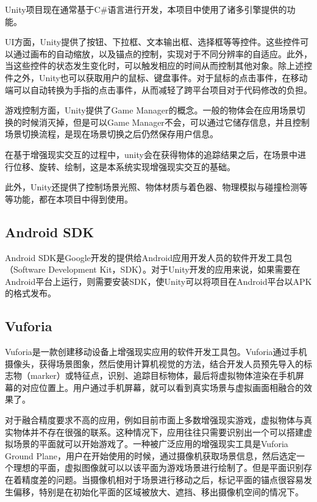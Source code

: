 Unity项目现在通常基于C\#语言进行开发，本项目中使用了诸多引擎提供的功能。
	
UI方面，Unity提供了按钮、下拉框、文本输出框、选择框等等控件。这些控件可以通过画布的自动缩放，以及锚点的控制，实现对于不同分辨率的自适应。此外，当这些控件的状态发生变化时，可以触发相应的时间从而控制其他对象。除上述控件之外，Unity也可以获取用户的鼠标、键盘事件。对于鼠标的点击事件，在移动端可以自动转换为手指的点击事件，从而减轻了跨平台项目对于代码修改的负担。

游戏控制方面，Unity提供了Game Manager的概念。一般的物体会在应用场景切换的时候消灭掉，但是可以Game Manager不会，可以通过它储存信息，并且控制场景切换流程，是现在场景切换之后仍然保存用户信息。

在基于增强现实交互的过程中，unity会在获得物体的追踪结果之后，在场景中进行位移、旋转、绘制，这是本系统实现增强现实交互的基础。

此外，Unity还提供了控制场景光照、物体材质与着色器、物理模拟与碰撞检测等等功能，都在本项目中得到使用。

\subsection{Android SDK}
Android SDK\cite{Android}是Google开发的提供给Android应用开发人员的软件开发工具包（Software Development Kit，SDK）。对于Unity开发的应用来说，如果需要在Android平台上运行，则需要安装SDK，使Unity可以将项目在Android平台以APK的格式发布。

\subsection{Vuforia}
	Vuforia\cite{Vuforia}是一款创建移动设备上增强现实应用的软件开发工具包。Vuforia通过手机摄像头，获得场景图象，然后使用计算机视觉的方法，结合开发人员预先导入的标志物（marker）或特征点，识别、追踪目标物体，最后将虚拟物体渲染在手机屏幕的对应位置上。用户通过手机屏幕，就可以看到真实场景与虚拟画面相融合的效果了。
	
对于融合精度要求不高的应用，例如目前市面上多数增强现实游戏，虚拟物体与真实物体并不存在很强的联系。这种情况下，应用往往只需要识别出一个可以搭建虚拟场景的平面就可以开始游戏了。一种被广泛应用的增强现实工具是Vuforia Ground Plane\cite{VuforiaGround}，用户在开始使用的时候，通过摄像机获取场景信息，然后选定一个理想的平面，虚拟图像就可以以该平面为游戏场景进行绘制了。但是平面识别存在着精度差的问题。当摄像机相对于场景进行移动之后，标记平面的锚点很容易发生偏移，特别是在初始化平面的区域被放大、遮挡、移出摄像机空间的情况下。

